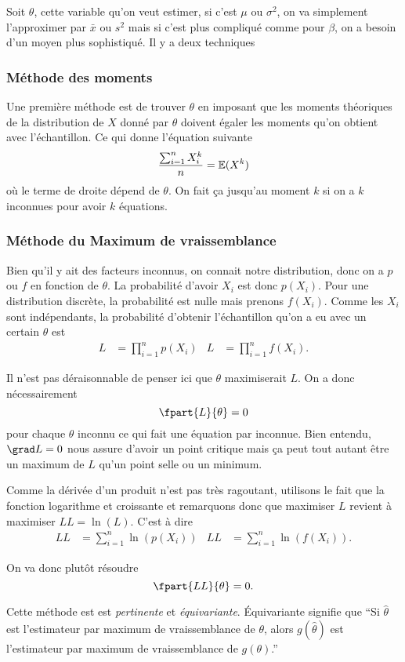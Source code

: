 Soit $\theta$, cette variable qu'on veut estimer,
si c'est $\mu$ ou $\sigma^2$, on va simplement l'approximer par $\bar{x}$ ou $s^2$ mais
si c'est plus compliqué comme pour $\beta$, on a besoin d'un moyen plus sophistiqué.
Il y a deux techniques

\subsubsection{Méthode des moments}
Une première méthode est de trouver $\theta$ en imposant que les moments théoriques
de la distribution de $X$ donné par $\theta$ doivent égaler les moments qu'on obtient
avec l'échantillon.
Ce qui donne l'équation suivante
\[ \frac{\sum_{i = 1}^n X_i^k}{n} = \mathbb{E}(X^k) \]
où le terme de droite dépend de $\theta$.
On fait ça jusqu'au moment $k$ si on a $k$ inconnues pour avoir $k$ équations.

\subsubsection{Méthode du Maximum de vraissemblance}
Bien qu'il y ait des facteurs inconnus,
on connait notre distribution,
donc on a $p$ ou $f$ en fonction de $\theta$.
La probabilité d'avoir $X_i$ est donc $p(X_i)$.
Pour une distribution discrète, la probabilité est nulle mais prenons $f(X_i)$.
Comme les $X_i$ sont indépendants,
la probabilité d'obtenir l'échantillon qu'on a eu avec un certain $\theta$ est
\begin{align*}
  L & = \prod_{i=1}^n p(X_i) & L & = \prod_{i=1}^n f(X_i).
\end{align*}

Il n'est pas déraisonnable de penser ici que $\theta$ maximiserait $L$.
On a donc nécessairement
\[ \fpart{L}{\theta} = 0 \]
pour chaque $\theta$ inconnu ce qui fait une équation par inconnue.
Bien entendu, $\grad L = 0$ nous assure d'avoir un point critique mais ça peut tout
autant être un maximum de $L$ qu'un point selle ou un minimum.

Comme la dérivée d'un produit n'est pas très ragoutant,
utilisons le fait que la fonction logarithme et croissante et remarquons
donc que maximiser $L$ revient à maximiser $LL = \ln(L)$. C'est à dire
\begin{align*}
  LL & = \sum_{i=1}^n \ln(p(X_i)) & LL & = \sum_{i=1}^n \ln(f(X_i)).
\end{align*}

On va donc plutôt résoudre
\[ \fpart{LL}{\theta} = 0. \]

Cette méthode est est \emph{pertinente} et \emph{équivariante}.
Équivariante signifie que
``Si $\hat{\theta}$ est l'estimateur par maximum de vraissemblance de $\theta$,
alors $g(\hat{\theta})$ est l'estimateur par maximum de vraissemblance
de $g(\theta)$.''

